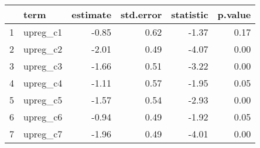 \documentclass{article}
\begin{document}


\begin{table}[ht]
\centering
\begin{tabular}{rlrrrr}
  \hline
 & term & estimate & std.error & statistic & p.value \\
  \hline
1 & upreg\_c1 & -0.85 & 0.62 & -1.37 & 0.17 \\
  2 & upreg\_c2 & -2.01 & 0.49 & -4.07 & 0.00 \\
  3 & upreg\_c3 & -1.66 & 0.51 & -3.22 & 0.00 \\
  4 & upreg\_c4 & -1.11 & 0.57 & -1.95 & 0.05 \\
  5 & upreg\_c5 & -1.57 & 0.54 & -2.93 & 0.00 \\
  6 & upreg\_c6 & -0.94 & 0.49 & -1.92 & 0.05 \\
  7 & upreg\_c7 & -1.96 & 0.49 & -4.01 & 0.00 \\
   \hline
\end{tabular}
\end{table}
\end{document}
